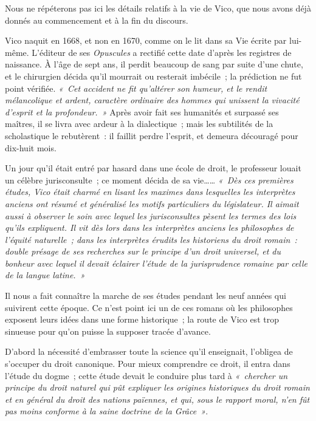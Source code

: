 \documentclass[french,twoside]{book} %
\newcommand{\astertri}{\medskip\par\centerline{\color{rubric}\large\selectfont{\syms ✻\,✻\,✻}}\medskip\par}%
\begin{document}
\astertri

\noindent Nous ne répéterons pas ici les détails relatifs à la vie de Vico, que nous avons déjà donnés au commencement et à la fin du discours.\par
Vico naquit en 1668, et non en 1670, comme on le lit dans sa Vie écrite par lui-même. L’éditeur de ses {\itshape Opuscules} a rectifié cette date d’après les registres de naissance. À l’âge de sept ans, il perdit beaucoup de sang par suite d’une chute, et le chirurgien décida qu’il mourrait ou resterait imbécile ; la prédiction ne fut point vérifiée. \emph{« Cet accident ne fit qu’altérer son humeur, et le rendit mélancolique et ardent, caractère ordinaire des hommes qui unissent la vivacité d’esprit et la profondeur. »} Après avoir fait ses humanités et surpassé ses maîtres, il se livra avec ardeur à la dialectique ; mais les subtilités de la scholastique le rebutèrent : il faillit perdre l’esprit, et demeura découragé pour dix-huit mois.\par
Un jour qu’il était entré par hasard dans une école de droit, le professeur louait un célèbre jurisconsulte ; ce moment décida de sa vie…… \emph{« Dès ces premières études, Vico était charmé en lisant les maximes dans lesquelles les interprètes anciens ont résumé et généralisé les motifs particuliers du législateur. Il aimait aussi à observer le soin avec lequel les jurisconsultes  pèsent les termes des lois qu’ils expliquent. Il vit dès lors dans les interprètes anciens les philosophes de l’équité naturelle ; dans les interprètes érudits les historiens du droit romain : double présage de ses recherches sur le principe d’un droit universel, et du bonheur avec lequel il devait éclairer l’étude de la jurisprudence romaine par celle de la langue latine. »}\par
Il nous a fait connaître la marche de ses études pendant les neuf années qui suivirent cette époque. Ce n’est point ici un de ces romans où les philosophes exposent leurs idées dans une forme historique ; la route de Vico est trop sinueuse pour qu’on puisse la supposer tracée d’avance.\par
D’abord la nécessité d’embrasser toute la science qu’il enseignait, l’obligea de s’occuper du droit canonique. Pour mieux comprendre ce droit, il entra dans l’étude du dogme ; cette étude devait le conduire plus tard à \emph{« chercher un principe du droit naturel qui pût expliquer les origines historiques du droit romain et en général du droit des nations païennes, et qui, sous le rapport moral, n’en fût pas moins conforme à la saine doctrine de la Grâce »}.\par
\end{document}
